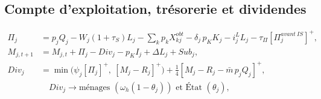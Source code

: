 \documentclass[11pt,a4paper]{article}
\newcommand{\pos}[1]{{\left[#1\right]^{+}}}
\begin{document}
\subsection{Compte d'exploitation, trésorerie et dividendes}
\begin{align}
\Pi_j &= p_j Q_j - W_j(1+\tau_S) L_j - \sum_k p_k X^{obt}_{kj} - \delta_j\, p_K K_j - i^L_j L_j - \tau_\Pi \pos{\Pi^{avant\ IS}_j}, \label{eq:profit}\\
M_{j,t+1} &= M_{j,t} + \Pi_j - Div_j - p_K I_j + \Delta L_j + Sub_j, \label{eq:cash}\\
Div_j &= \min\!\big(\psi_j \pos{\Pi_j},\ \pos{M_j - R_j}\big) + \tfrac14\pos{M_j - R_j - \bar m\,p_jQ_j}, \label{eq:div}\\
&\quad Div_j \to \text{ménages } (\omega_h (1-\theta_j)) \text{ et État } (\theta_j), \nonumber
\end{align}
\end{document}
